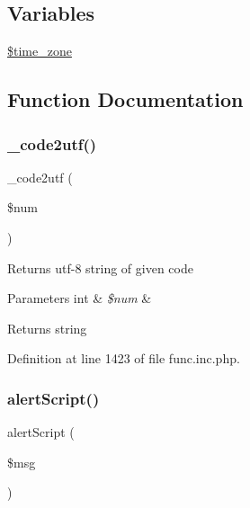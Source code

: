 \subsection*{Variables}
\begin{DoxyCompactItemize}
\item 
\hyperlink{func_8inc_8php_adce4610b55a895abff73b5ed259c4bd3}{\$time\+\_\+zone}
\end{DoxyCompactItemize}


\subsection{Function Documentation}
\hypertarget{func_8inc_8php_a07446b33f4eda53315b12fc1c1b15f5a}{}\label{func_8inc_8php_a07446b33f4eda53315b12fc1c1b15f5a} 
\subsubsection{\texorpdfstring{\+\_\+code2utf()}{\_code2utf()}}
{\footnotesize\ttfamily \+\_\+code2utf (\begin{DoxyParamCaption}\item[{}]{\$num }\end{DoxyParamCaption})}

Returns utf-\/8 string of given code


\begin{DoxyParams}[1]{Parameters}
int & {\em \$num} & \\
\hline
\end{DoxyParams}
\begin{DoxyReturn}{Returns}
string 
\end{DoxyReturn}


Definition at line 1423 of file func.\+inc.\+php.

\hypertarget{func_8inc_8php_acc16be2ad7371ac6478f2314f1248fe2}{}\label{func_8inc_8php_acc16be2ad7371ac6478f2314f1248fe2} 
\subsubsection{\texorpdfstring{alert\+Script()}{alertScript()}}
{\footnotesize\ttfamily alert\+Script (\begin{DoxyParamCaption}\item[{}]{\$msg }\end{DoxyParamCaption})}


